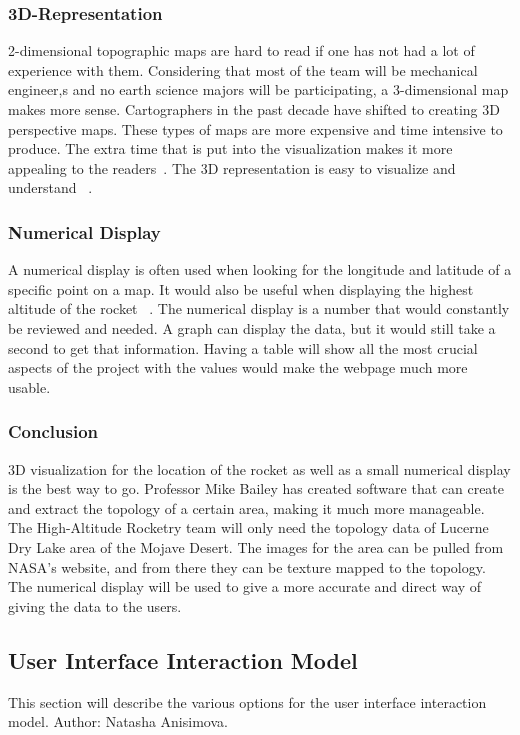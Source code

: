 \documentclass[10pt,draftclsnofoot,onecolumn]{IEEEtran}
\begin{document}
	\subsubsection{3D-Representation}
	2-dimensional topographic maps are hard to read if one has not had a lot of experience with them. 
	Considering that most of the team will be mechanical engineer,s and no earth science majors will be participating, a 
	3-dimensional map makes more sense. 
	Cartographers in the past decade have shifted to creating 3D perspective maps. 
	These types of maps are more expensive and time intensive to produce. 
	The extra time that is put into the visualization makes it more appealing to the readers~\cite{evaluating-the-effectiveness-of-2d-vs-3d-trailhead-maps}. 
	The 3D representation is easy to visualize and understand ~\cite{3d-represenation-for-software-visualization}.
	
	\subsubsection{Numerical Display}
	A numerical display is often used when looking for the longitude and latitude of a specific point on a map. 
	It would also be useful when displaying the highest altitude of the rocket ~\cite{data-display}. 
	The numerical display is a number that would constantly be reviewed and needed. 
	A graph can display the data, but it would still take a second to get that information. 
	Having a table will show all the most crucial aspects of the project with the values would make the webpage much more usable.
	
	\subsubsection{Conclusion}
	3D visualization for the location of the rocket as well as a small numerical display is the best way to go. 
	Professor Mike Bailey has created software that can create and extract the topology of a certain area, 
	making it much more manageable. 
	The High-Altitude Rocketry team will only need the topology data of Lucerne Dry Lake area of the Mojave Desert. 
	The images for the area can be pulled from NASA's website, and from there they can be texture mapped to the topology. 
	The numerical display will be used to give a more accurate and direct way of giving the data to the users. 
	
	\subsection{User Interface Interaction Model}
	This section will describe the various options for the user interface interaction model. Author: Natasha Anisimova.
	
\end{document}
